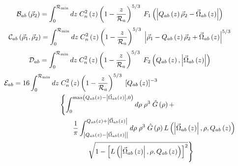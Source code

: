 \begin{equation}\label{caliph_B}
\mathcal{B}_{ab}\left(\vec{\rho}_{2}\right) = 
\int_{0}^{\mathcal{R}_{\rm min}} dz \; C_{n}^{2}\left(z\right) \left( 1 - \frac{z}{\mathcal{R}_{a}}\right)^{5/3}\; 
F_{1}\left(\left\vert Q_{ab}\left(z\right)\vec{\rho}_{2} - \vec{\Omega}_{ab}\left(z\right)\right\vert\right)
\end{equation}
\begin{equation}\label{caliph_C}
\mathcal{C}_{ab}\left(\vec{\rho}_{1}, \vec{\rho}_{2}\right) = 
\int_{0}^{\mathcal{R}_{\rm min}} dz \; C_{n}^{2}\left(z\right) \left( 1 - \frac{z}{\mathcal{R}_{a}}\right)^{5/3}\; 
\left\vert\vec{\rho}_{1} - Q_{ab}\left(z\right)\vec{\rho}_{2} + \vec{\Omega}_{ab}\left(z\right)\right\vert^{5/3}
\end{equation}
\begin{equation}\label{caliph_D}
\mathcal{D}_{ab} = 
\int_{0}^{\mathcal{R}_{\rm min}} dz \; C_{n}^{2}\left(z\right) \left( 1 - \frac{z}{\mathcal{R}_{a}}\right)^{5/3}\; 
F_{2}\left(Q_{ab}\left(z\right),\left\vert\vec{\Omega}_{ab}\left(z\right)\right\vert\right)
\end{equation}
\begin{equation}\label{caliph_E}
\begin{split}
\mathcal{E}_{ab} = 
16 \int_{0}^{\mathcal{R}_{\rm min}} dz & \; C_{n}^{2}\left(z\right) \left( 1 - \frac{z}{\mathcal{R}_{a}}\right)^{5/3}\; 
\left[Q_{ab}\left(z\right)\right]^{-3}
\\ 
& \left\{\int_{0}^{{\rm max}\left(Q_{ab}\left(z\right)-\left\vert \vec{\Omega}_{ab} \left(z\right)\right\vert,0\right)} d\rho \; \rho^{3} \; \hat{G}\left(\rho\right) + 
\right.
\\ 
& 
\quad\quad
\frac{1}{\pi} \int^{Q_{ab}\left(z\right)+\left\vert \vec{\Omega}_{ab}\left(z\right)\right\vert}_{\left\vert Q_{ab}\left(z\right)-\left\vert \vec{\Omega}_{ab}\left(z\right)\right\vert\right\vert}
d\rho \; \rho^{3} \; \hat{G}\left(\rho\right) L\left(\left\vert\vec{\Omega}_{ab}\left(z\right)\right\vert, \rho, Q_{ab}\left(z\right)\right) \\
& 
\quad\quad\quad\quad
\left.
\sqrt{1 - \left[L\left(\left\vert\vec{\Omega}_{ab}\left(z\right)\right\vert, \rho, Q_{ab}\left(z\right)\right)\right]^{2}}
\vphantom{\int_{0}^{{\rm max}\left(Q_{ab}\left(z\right)-\left\vert \vec{\Omega}_{ab} \left(z\right)\right\vert,0\right)}}
\right\} 
\end{split}
\end{equation}
